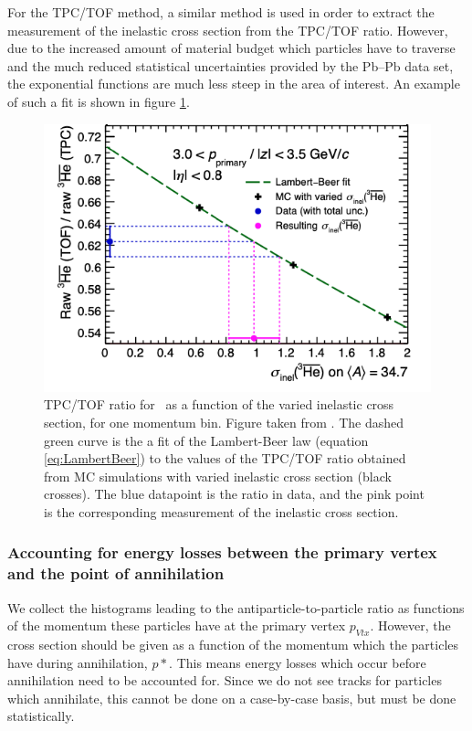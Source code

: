 For the TPC/TOF method, a similar method is used in order to extract the measurement of the inelastic cross section from the TPC/TOF ratio. However, due to the increased amount of material budget which particles have to traverse and the much reduced statistical uncertainties provided by the Pb--Pb data set, the exponential functions are much less steep in the area of interest. An example of such a fit is shown in figure \ref{fig:TPCTOF_fit}. 

\begin{figure}
    \centering
    \includegraphics[width=\textwidth]{figures/TOF-TPC_ratio_xs_extraction.png}
    \caption{TPC/TOF ratio for \ahe\ as a function of the varied inelastic cross section, for one momentum bin. Figure taken from \cite{antiHe3XS}. The dashed green curve is the a fit of the Lambert-Beer law (equation \ref{eq:LambertBeer}) to the values of the TPC/TOF ratio obtained from MC simulations with varied inelastic cross section (black crosses). The blue datapoint is the ratio in data, and the pink point is the corresponding measurement of the inelastic cross section. }
    \label{fig:TPCTOF_fit}
\end{figure}


\subsubsection{Accounting for energy losses between the primary vertex and the point of annihilation}\label{sec:Meth:ELoss}
We collect the histograms leading to the antiparticle-to-particle ratio as functions of the momentum these particles have at the primary vertex $p_{Vtx}$. However, the cross section should be given as a function of the momentum which the particles have during annihilation, $p*$. This means energy losses which occur before annihilation need to be accounted for. Since we do not see tracks for particles which annihilate, this cannot be done on a case-by-case basis, but must be done statistically.\\


